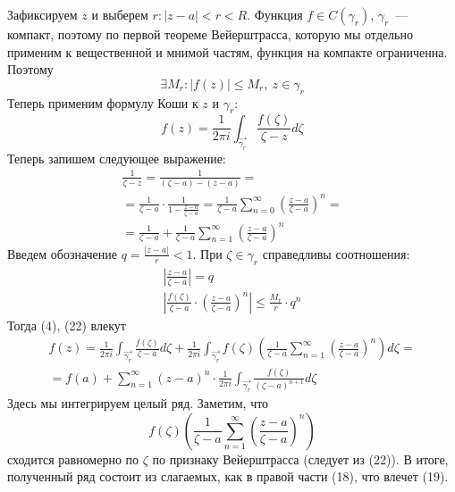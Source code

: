 \documentclass[main]{subfiles}
\begin{document}
\begin{longProof}
    Зафиксируем $z$ и выберем $r: |z - a| < r < R$.
    Функция $f \in C(\gamma_r)$, $\gamma_r$~--- компакт, поэтому по первой теореме Вейерштрасса, которую мы отдельно применим к вещественной и мнимой частям, функция на компакте ограниченна.
    Поэтому
    \[\exists M_r: |f(z)| \le  M_r,\ z \in \gamma_r \tag{20}\]
    Теперь применим формулу Коши к $z$ и $\gamma_r$:
    \[f(z) = \frac{1}{2 \pi i} \int_{\overrightarrow{\gamma_r}} \frac{f(\zeta)}{\zeta - z} d\zeta \tag{4}\]
    Теперь запишем следующее выражение:
    \begin{multline*}
        \frac{1}{\zeta - z} = \frac{1}{(\zeta - a) - (z - a)} = \\
        = \frac{1}{\zeta - a} \cdot \frac{1}{1 - \frac{z - a}{\zeta - a}} = \frac{1}{\zeta - a} \sum_{n = 0 }^{\infty} \left(\frac{z - a}{\zeta -a}\right)^n = \\
        = \frac{1}{\zeta - a} + \frac{1}{\zeta - a} \sum_{n = 1 }^{\infty} \left(\frac{z - a}{\zeta -a}\right)^n \tag{21}
    \end{multline*}
    Введем обозначение $q = \frac{|z - a|}{r} < 1$.
    При $\zeta \in \gamma_r$ справедливы соотношения:
    \begin{gather*}
        \left| \frac{z - a}{\zeta - a}\right| = q\\
        \left| \frac{f(\zeta)}{\zeta - a} \cdot \left( \frac{z - a}{\zeta - a} \right)^n \right| \le \frac{M_r}{r} \cdot q^n \tag{22}
    \end{gather*}
    Тогда (4), (22) влекут
    \begin{multline*}
        f(z) = \frac{1}{2 \pi i} \int_{\overrightarrow{\gamma_r}} \frac{f(\zeta)}{\zeta - a} d\zeta + \frac{1}{2 \pi i} \int_{\overrightarrow{\gamma_r}} f(\zeta) \left(\frac{1}{\zeta - a}  \sum_{n = 1 }^{\infty} \left(\frac{z - a}{\zeta -a}\right)^n\right)d\zeta = \\
        = f(a) + \sum_{n=1}^{\infty} (z-a)^n \cdot \frac{1}{2 \pi i} \int_{\overrightarrow{\gamma_r}} \frac{f(\zeta)}{(\zeta - a)^{n+1}} d\zeta
    \end{multline*}
    Здесь мы интегрируем целый ряд.
    Заметим, что
    \[f(\zeta) \left(\frac{1}{\zeta - a}  \sum_{n = 1 }^{\infty} \left(\frac{z - a}{\zeta -a}\right)^n\right)\]
    сходится равномерно по $\zeta$ по признаку Вейерштрасса (следует из (22)).
    В итоге, полученный ряд состоит из слагаемых, как в правой части (18), что влечет (19).
\end{longProof}
\end{document}
